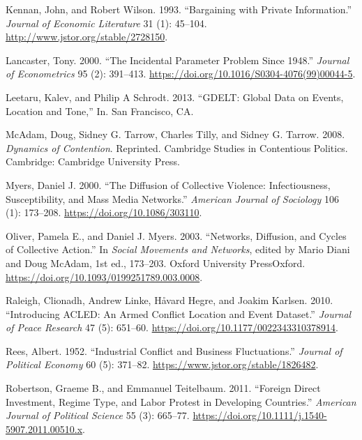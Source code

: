\documentclass[
  11pt,
]{article}
\newlength{\cslhangindent}
\newenvironment{CSLReferences}[2] %
 {\begin{list}{}{%
  \setlength{\itemindent}{0pt}
  \setlength{\leftmargin}{0pt}
  \setlength{\parsep}{0pt}
  \ifodd #1
   \setlength{\leftmargin}{\cslhangindent}
   \setlength{\itemindent}{-1\cslhangindent}
  \fi
  \setlength{\itemsep}{#2\baselineskip}}}
 {\end{list}}
\begin{document}
\begin{CSLReferences}{1}{0}
Kennan, John, and Robert Wilson. 1993. {``Bargaining with Private
Information.''} \emph{Journal of Economic Literature} 31 (1): 45--104.
\url{http://www.jstor.org/stable/2728150}.

Lancaster, Tony. 2000. {``The Incidental Parameter Problem Since
1948.''} \emph{Journal of Econometrics} 95 (2): 391--413.
\url{https://doi.org/10.1016/S0304-4076(99)00044-5}.

Leetaru, Kalev, and Philip A Schrodt. 2013. {``{GDELT}: {Global Data} on
{Events}, {Location} and {Tone},''} In. San Francisco, CA.

McAdam, Doug, Sidney G. Tarrow, Charles Tilly, and Sidney G. Tarrow.
2008. \emph{Dynamics of Contention}. Reprinted. Cambridge Studies in
Contentious Politics. Cambridge: Cambridge University Press.

Myers, Daniel J. 2000. {``The {Diffusion} of {Collective Violence}:
{Infectiousness}, {Susceptibility}, and {Mass Media Networks}.''}
\emph{American Journal of Sociology} 106 (1): 173--208.
\url{https://doi.org/10.1086/303110}.

Oliver, Pamela E., and Daniel J. Myers. 2003. {``Networks, {Diffusion},
and {Cycles} of {Collective Action}.''} In \emph{Social {Movements} and
{Networks}}, edited by Mario Diani and Doug McAdam, 1st ed., 173--203.
Oxford University PressOxford.
\url{https://doi.org/10.1093/0199251789.003.0008}.

Raleigh, Clionadh, Andrew Linke, Håvard Hegre, and Joakim Karlsen. 2010.
{``Introducing {ACLED}: {An Armed Conflict Location} and {Event
Dataset}.''} \emph{Journal of Peace Research} 47 (5): 651--60.
\url{https://doi.org/10.1177/0022343310378914}.

Rees, Albert. 1952. {``Industrial {Conflict} and {Business
Fluctuations}.''} \emph{Journal of Political Economy} 60 (5): 371--82.
\url{https://www.jstor.org/stable/1826482}.

Robertson, Graeme B., and Emmanuel Teitelbaum. 2011. {``Foreign {Direct
Investment}, {Regime Type}, and {Labor Protest} in {Developing
Countries}.''} \emph{American Journal of Political Science} 55 (3):
665--77. \url{https://doi.org/10.1111/j.1540-5907.2011.00510.x}.


\end{CSLReferences}
\end{document}
